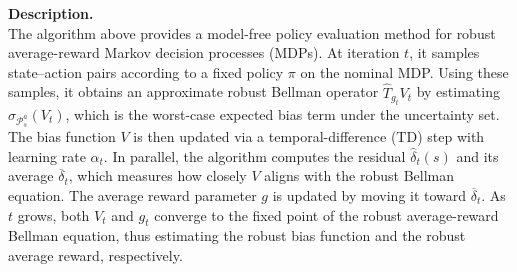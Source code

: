 \noindent
\textbf{Description.} \\
The algorithm above provides a model-free policy evaluation method for robust average-reward Markov decision processes (MDPs). At iteration \(t\), it samples state--action pairs according to a fixed policy \(\pi\) on the nominal MDP. Using these samples, it obtains an approximate robust Bellman operator \(\widehat{T}_{g_t}V_t\) by estimating \(\sigma_{\mathcal{P}^a_s}(V_t)\), which is the worst-case expected bias term under the uncertainty set. The bias function \(V\) is then updated via a temporal-difference (TD) step with learning rate \(\alpha_t\). In parallel, the algorithm computes the residual \(\widehat{\delta}_t(s)\) and its average \(\overline{\delta}_t\), which measures how closely \(V\) aligns with the robust Bellman equation. The average reward parameter \(g\) is updated by moving it toward \(\overline{\delta}_t\). As \(t\) grows, both \(V_t\) and \(g_t\) converge to the fixed point of the robust average-reward Bellman equation, thus estimating the robust bias function and the robust average reward, respectively.

